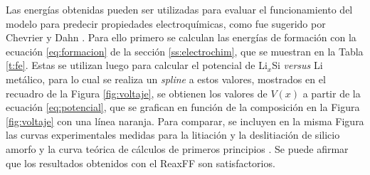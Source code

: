 Las energías obtenidas pueden ser utilizadas para evaluar el funcionamiento del 
modelo para predecir propiedades electroquímicas, como fue sugerido por Chevrier
y Dahn \cite{chevrier2009}. Para ello primero se calculan las energías de formación
con la ecuación \ref{eq:formacion} de la sección \ref{ss:electrochim}, que se muestran
en la Tabla \ref{t:fe}. Estas se utilizan luego para calcular el potencial de Li$_x$Si 
\textit{versus} Li metálico, para lo cual se realiza un \textit{spline} 
a estos valores, mostrados en el recuadro de la Figura \ref{fig:voltaje}, se obtienen
los valores de $V(x)$ a partir de la ecuación \ref{eq:potencial}, que se grafican en 
función de la composición en la Figura \ref{fig:voltaje} con una línea naranja. Para 
comparar, se incluyen en la misma Figura las curvas experimentales medidas para la
litiación y la deslitiación de silicio amorfo \cite{hatchard2004} y la curva teórica 
de cálculos de primeros principios \cite{chevrier2009}. Se puede afirmar que los 
resultados obtenidos con el ReaxFF son satisfactorios.
\begin{table}[h!]
    \centering
    \caption{Energías de formación obtenidas a través de la ecuación \ref{eq:formacion}}
    \setlength\extrarowheight{2pt}
    \label{t:fe}
\end{table}
